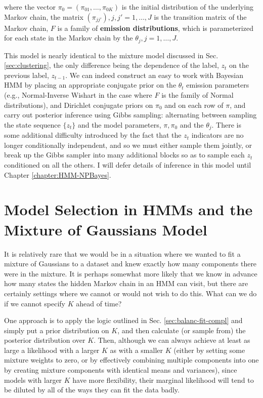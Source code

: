 where the vector $\pi_0 = (\pi_{01}, \dots, \pi_{0K})$ is the initial
distribution of the underlying Markov chain, the matrix $(\pi_{jj'}),
j,j' = 1, \dots, J$ is the transition matrix of the Markov chain, $F$
is a family of {\bf emission distributions}, which is parameterized
for each state in the Markov chain by the $\theta_j, j = 1, \dots, J$.

This model is nearly identical to the mixture model discussed in
Sec. \ref{sec:clustering}, the only difference being the dependence of
the label, $z_t$ on the previous label, $z_{t-1}$.  We can indeed
construct an easy to work with Bayesian HMM by placing an appropriate 
conjugate prior on the $\theta_t$ emission parameters (e.g.,
Normal-Inverse Wishart in the case where $F$ is the family of Normal
distributions), and Dirichlet conjugate priors on $\pi_0$ and 
on each row of $\pi$, and carry out posterior inference using Gibbs
sampling: alternating between sampling the state sequence $\{z_t\}$
and the model parameters, $\pi, \pi_0$ and the $\theta_j$.  There is
some additional difficulty introduced by the fact that the $z_t$
indicators are no longer conditionally independent, and so we must
either sample them jointly, or break up the Gibbs sampler into
many additional blocks so as to sample each $z_t$ conditioned on all
the others.  I will defer details of inference in this model until
Chapter \ref{chapter:HMM-NPBayes}.


\section{Model Selection in HMMs and the Mixture of Gaussians Model}
\label{sec:model-select-mixt}

It is relatively rare that we would be in a situation where we wanted
to fit a mixture of Gaussians to a dataset and knew exactly how many
components there were in the mixture.  It is perhaps somewhat more
likely that we know in advance how many
states the hidden Markov chain in an HMM can visit, but there are
certainly settings where we cannot or would not wish to do this. 
What can we do if we cannot specify $K$ ahead of time?

One approach is to apply the logic outlined in
Sec. \ref{sec:balanc-fit-compl} and simply put a prior distribution on
$K$, and then calculate (or sample from) the posterior distribution
over $K$.  Then, although we can always achieve at least as large a
likelihood with a larger $K$ as with a smaller $K$ (either by setting
some mixture weights to zero, or by effectively combining multiple
components into one by creating mixture components with
identical means and variances), since models with larger $K$ have more flexibility, their
marginal likelihood will tend to be diluted by all of the ways they can fit
the data badly.


